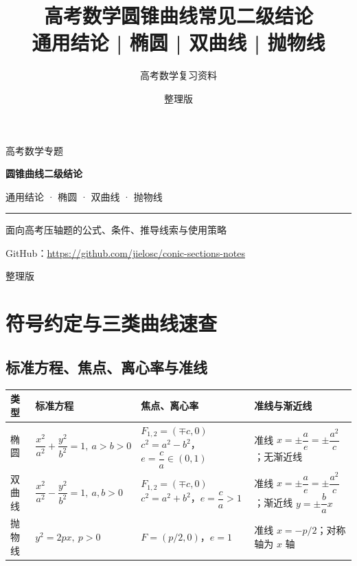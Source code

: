 \documentclass[UTF8,zihao=-4,a4paper]{ctexart}
\title{\bfseries 高考数学圆锥曲线常见二级结论\\[0.4em]\large 通用结论 \;|\; 椭圆 \;|\; 双曲线 \;|\; 抛物线}
\author{高考数学复习资料}
\date{整理版 \quad 2026}
\begin{document}
\begin{titlepage}
  \thispagestyle{empty}
  \centering
  \vspace*{3.2cm}
  {\sffamily\large 高考数学专题}\par
  \vspace{1.6em}
  {\sffamily\bfseries\fontsize{32}{38}\selectfont 圆锥曲线二级结论}\par
  \vspace{1.4em}
  {\sffamily\large 通用结论 \;·\; 椭圆 \;·\; 双曲线 \;·\; 抛物线}\par
  \vspace{2.6em}
  {\color{black!30}\rule{9.5cm}{0.7pt}}\par
  \vspace{2.2em}
  {\large 面向高考压轴题的公式、条件、推导线索与使用策略}\par
  \vfill
  {\small\textcolor{black!65}{GitHub：\url{https://github.com/jielosc/conic-sections-notes}}}\par
  \vspace{0.9em}
  {\small\textcolor{black!65}{整理版 }}\par
  \vspace{1.4cm}
\end{titlepage}

\pagestyle{empty}
{\footnotesize
{}
\tableofcontents}
\clearpage

\pagestyle{fancy}

\section{符号约定与三类曲线速查}

\subsection{标准方程、焦点、离心率与准线}

\renewcommand{\arraystretch}{1.45}
\setlength{\tabcolsep}{4pt}
\begin{longtable}{>{\centering\arraybackslash}p{1.5cm}p{4.9cm}p{4.9cm}p{3.9cm}}
\toprule
类型 & 标准方程 & 焦点、离心率 & 准线与渐近线\\
\midrule
椭圆 &
$\dfrac{x^2}{a^2}+\dfrac{y^2}{b^2}=1,\ a>b>0$ &
$F_{1,2}=(\mp c,0)$\newline $c^2=a^2-b^2$，$e=\dfrac ca\in(0,1)$ &
准线 $x=\pm\dfrac{a}{e}=\pm\dfrac{a^2}{c}$；\newline 无渐近线\\
双曲线 &
$\dfrac{x^2}{a^2}-\dfrac{y^2}{b^2}=1,\ a,b>0$ &
$F_{1,2}=(\mp c,0)$\newline $c^2=a^2+b^2$，$e=\dfrac ca>1$ &
准线 $x=\pm\dfrac{a}{e}=\pm\dfrac{a^2}{c}$；\newline 渐近线 $y=\pm\dfrac ba x$\\
抛物线 &
$y^2=2px,\ p>0$ &
$F=(p/2,0)$，$e=1$ &
准线 $x=-p/2$；\newline 对称轴为 $x$ 轴\\
\bottomrule
\end{longtable}
\setlength{\tabcolsep}{6pt}
\end{document}
